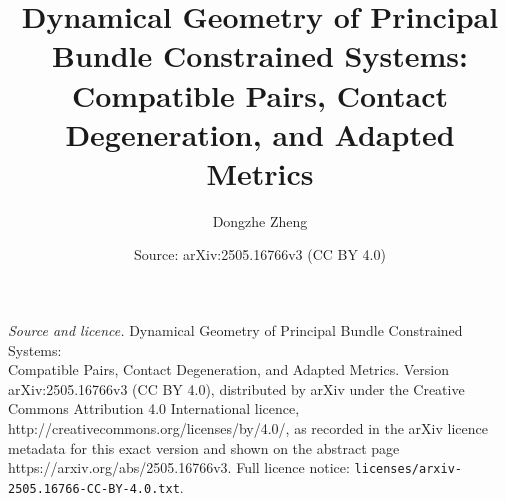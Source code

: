 \documentclass[10pt,a4paper]{amsart}
\title{Dynamical Geometry of Principal Bundle Constrained Systems:\\Compatible Pairs, Contact Degeneration, and Adapted Metrics}
\author{Dongzhe Zheng}
\date{Source: arXiv:2505.16766v3 (CC BY 4.0)}
\begin{document}
\maketitle

\noindent\emph{Source and licence.} Dynamical Geometry of Principal Bundle Constrained Systems:\\Compatible Pairs, Contact Degeneration, and Adapted Metrics. Version arXiv:2505.16766v3 (CC BY 4.0), distributed by arXiv under the Creative Commons Attribution 4.0 International licence, http://creativecommons.org/licenses/by/4.0/, as recorded in the arXiv licence metadata for this exact version and shown on the abstract page https://arxiv.org/abs/2505.16766v3. Full licence notice: \texttt{licenses/arxiv-2505.16766-CC-BY-4.0.txt}.\par\smallskip
\end{document}
